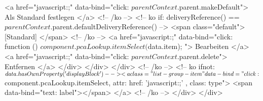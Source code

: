                             <a href="javascript:;" data-bind="click: $parentContext.$parent.makeDefault">
                                Als Standard festlegen
                            </a>
                            <!-- /ko -->
                            <!-- ko if: deliveryReference() == $parentContext.$parent.defaultDeliveryReference() -->
                            <span class="default">
                                [Standard]
                            </span>
                            <!-- /ko -->
                            <a href="javascript:;" data-bind="click: function () { $component.pcaLookup.itemSelect($data.item); }">
                                Bearbeiten
                            </a>
                            <a href="javascript:;" data-bind="click: $parentContext.$parent.delete">
                                Entfernen
                            </a>
                        </div>
                    </div>
                </div>
                <!-- /ko -->
                <!-- ko ifnot: $data.hasOwnProperty('displayBlock') -->
                <a class="list-group-item" data-bind="click: $component.pcaLookup.itemSelect, attr: { href: 'javascript:;' }, class: type">
                    <span data-bind="text: label"></span>
                </a>
                <!-- /ko -->
            </div>
        </div>
        
